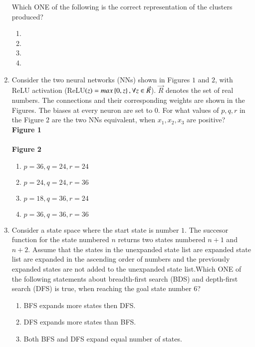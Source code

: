 \documentclass[journal,12pt,onecolumn]{IEEEtran}
\theoremstyle{remark}
\begin{document}
\begin{enumerate}
\begin{table}[h!]    
  \centering
  
\end{table}

Which ONE of the following is the correct representation of the clusters produced?
  \begin{enumerate}
      \item 
      \item 
      \item 
      \item 
  \end{enumerate}  
  \item Consider the two neural networks (NNs) shown in Figures $1$ and $2$, with ReLU activation (ReLU$\left(z\right)=max\left\{0,z\right\},\forall z \in \Vec{R}$). $\Vec{R}$ denotes the set of real numbers. The connections and their corresponding weights are shown in the Figures. The biases at every neuron are set to $0$. For what values of $p,q,r$ in the Figure $2$ are the two NNs equivalent, when $x_1,x_2,x_3$ are positive? \\
  \textbf{Figure 1}\\
  \\
  \textbf{Figure 2}\\
  
  \begin{enumerate}
      \item $p=36,q=24,r=24$
      \item $p=24,q=24,r=36$
      \item $p=18,q=36,r=24$
      \item $p=36,q=36,r=36$
  \end{enumerate}
  \item Consider a state space where the start state is number $1$. The succesor function for the state numbered $n$ returns two states numbered $n+1$ and $n+2$. Assume that the states in the unexpanded state list are expanded state list are expanded in the ascending order of numbers and the previously expanded states are not added to the unexpanded state list.Which ONE of the following statements about breadth-first search (BDS) and depth-first search (DFS) is true, when reaching the goal state number $6$?
  \begin{enumerate}
      \item BFS expands more states then DFS.
      \item DFS expands more states than BFS.
      \item Both BFS and DFS expand equal number of states.

\end{enumerate}
\end{enumerate}
\end{document}
